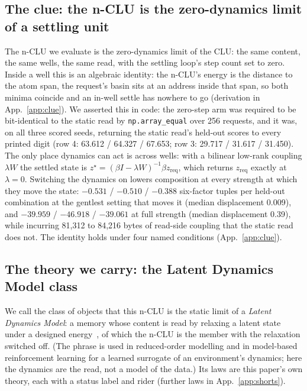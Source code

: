 \documentclass{article} %
\begin{document}
\subsection{The clue: the n-CLU is the zero-dynamics limit of a settling unit}
\label{sec:clue}

The n-CLU we evaluate is the zero-dynamics limit of the CLU: the same content, the same wells,
the same read, with the settling loop's step count set to zero. Inside a well this is an
algebraic identity: the n-CLU's energy is the distance to the atom span, the request's basin sits
at an address inside that span, so both minima coincide and an in-well settle has nowhere to go
(derivation in App.~\ref{app:clue}). We asserted this in code: the zero-step arm was required to be bit-identical to
the static read by \texttt{np.array\_equal} over 256 requests, and it was, on all three scored
seeds, returning the static read's held-out scores to every printed digit (row 4: 63.612 /
64.327 / 67.653; row 3: 29.717 / 31.617 / 31.450). %
The only place dynamics can act is across wells: with a bilinear low-rank coupling $\lambda W$
the settled state is $z^\star=(\beta I-\lambda W)^{-1}\beta z_{\text{req}}$, which returns
$z_{\text{req}}$ exactly at $\lambda=0$. Switching the dynamics on lowers composition at every
strength at which they move the state: $-0.531$ / $-0.510$ / $-0.388$ six-factor tuples per
held-out combination at the gentlest setting that moves it (median displacement 0.009), and $-39.959$ /
$-46.918$ / $-39.061$ at full strength (median displacement 0.39), while incurring 81,312 to 84,216
bytes of read-side coupling that the static read does not. %
The identity holds under four named conditions (App.~\ref{app:clue}).

\subsection{The theory we carry: the Latent Dynamics Model class}
\label{sec:theory}

We call the class of objects that this n-CLU is the static limit of a \emph{Latent Dynamics
Model}: a memory whose content is read by relaxing a latent state under a designed energy~\citep{hopfield1982neural,krotov2016dense,ramsauer2021hopfield,hoover2023energy,kong2024reservoir}, of
which the n-CLU is the member with the relaxation switched off. (The phrase is used in
reduced-order modelling and in model-based reinforcement learning for a learned surrogate of an
environment's dynamics; here the dynamics are the read, not a model of the data.) Its laws are this paper's own theory, each with a status label and rider (further laws in App.~\ref{app:shorts}).
\end{document}
